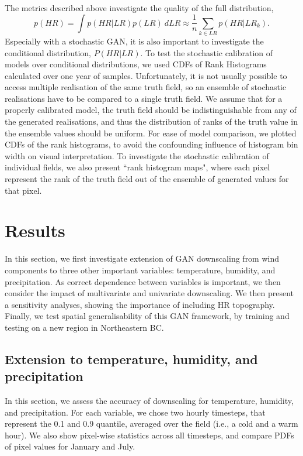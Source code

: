 \documentclass{ametsocV6.1}
\begin{document}
The metrics described above investigate the quality of the full distribution, 
\begin{equation}
    p(HR) = \int p(HR | LR) p(LR) ~ dLR \approx \frac{1}{n}\sum_{k \in LR} p(HR | LR_k).
\end{equation}
Especially with a stochastic GAN, it is also important to investigate the conditional distribution, $P(HR|LR)$. To test the stochastic calibration of models over conditional distributions, we used CDFs of Rank Histograms calculated over one year of samples. Unfortunately, it is not usually possible to access multiple realisation of the same truth field, so an ensemble of stochastic realisations have to be compared to a single truth field. We assume that for a properly calibrated model, the truth field should be indistinguishable from any of the generated realisations, and thus the distribution of ranks of the truth value in the ensemble values should be uniform. For ease of model comparison, we plotted CDFs of the rank histograms, to avoid the confounding influence of histogram bin width on visual interpretation. To investigate the stochastic calibration of individual fields, we also present ``rank histogram maps", where each pixel represent the rank of the truth field out of the ensemble of generated values for that pixel. 

\section{Results}
In this section, we first investigate extension of GAN downscaling from wind components to three other important variables: temperature, humidity, and precipitation. As correct dependence between variables is important, we then consider the impact of multivariate and univariate downscaling. We then present a sensitivity analyses, showing the importance of including HR topography. Finally, we test spatial generalisability of this GAN framework, by training and testing on a new region in Northeastern BC. 

\subsection{Extension to temperature, humidity, and precipitation}
In this section, we assess the accuracy of downscaling for temperature, humidity, and precipitation. For each variable, we chose two hourly timesteps, that represent the 0.1 and 0.9 quantile, averaged over the field (i.e., a cold and a warm hour). We also show pixel-wise statistics across all timesteps, and compare PDFs of pixel values for January and July. 
\end{document}
